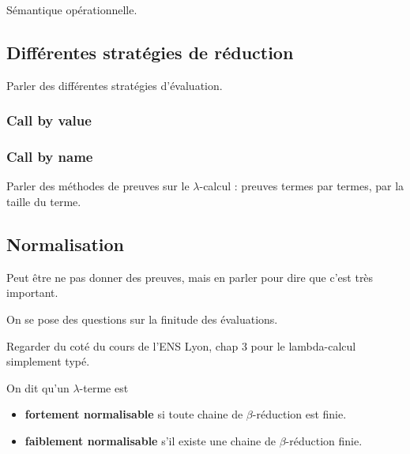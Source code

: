 Sémantique opérationnelle.

\subsection{Différentes stratégies de réduction}

Parler des différentes stratégies d'évaluation.

\subsubsection*{Call by value}
\subsubsection*{Call by name}

Parler des méthodes de preuves sur le $\lambda$-calcul : preuves termes par
termes, par la taille du terme.

\subsection*{Normalisation}

Peut être ne pas donner des preuves, mais en parler pour dire que c'est très important.

On se pose des questions sur la finitude des évaluations.

Regarder du coté du cours de l'ENS Lyon, chap 3 pour le lambda-calcul simplement typé.

\begin{definition}
  On dit qu'un $\lambda$-terme est
  \begin{itemize}
  \item \textbf{fortement normalisable} si
  toute chaine de $\beta$-réduction est finie.
  \item \textbf{faiblement normalisable} s'il existe une chaine de
    $\beta$-réduction finie.
  \end{itemize}
\end{definition}

